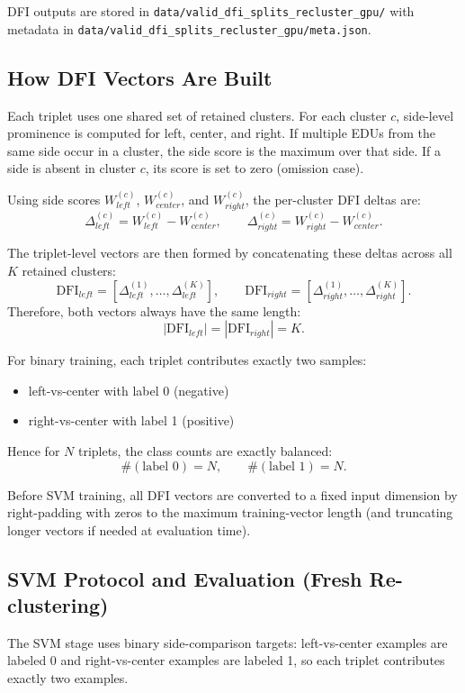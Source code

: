 \documentclass[12pt,a4paper]{article}
\begin{document}
DFI outputs are stored in
\texttt{data/valid\_dfi\_splits\_recluster\_gpu/}
with metadata in
\texttt{data/valid\_dfi\_splits\_recluster\_gpu/meta.json}.

\subsection{How DFI Vectors Are Built}

Each triplet uses one shared set of retained clusters.
For each cluster $c$, side-level prominence is computed for left, center, and right.
If multiple EDUs from the same side occur in a cluster, the side score is the maximum over that side.
If a side is absent in cluster $c$, its score is set to zero (omission case).

Using side scores $W^{(c)}_{left}$, $W^{(c)}_{center}$, and $W^{(c)}_{right}$,
the per-cluster DFI deltas are:
\[
\Delta^{(c)}_{left}=W^{(c)}_{left}-W^{(c)}_{center},\qquad
\Delta^{(c)}_{right}=W^{(c)}_{right}-W^{(c)}_{center}.
\]

The triplet-level vectors are then formed by concatenating these deltas across all $K$ retained clusters:
\[
\mathrm{DFI}_{left}=[\Delta^{(1)}_{left},\ldots,\Delta^{(K)}_{left}],\qquad
\mathrm{DFI}_{right}=[\Delta^{(1)}_{right},\ldots,\Delta^{(K)}_{right}].
\]
Therefore, both vectors always have the same length:
\[
|\mathrm{DFI}_{left}|=|\mathrm{DFI}_{right}|=K.
\]

For binary training, each triplet contributes exactly two samples:
\begin{itemize}
\item left-vs-center with label 0 (negative)
\item right-vs-center with label 1 (positive)
\end{itemize}
Hence for $N$ triplets, the class counts are exactly balanced:
\[
\#(\text{label }0)=N,\qquad \#(\text{label }1)=N.
\]

Before SVM training, all DFI vectors are converted to a fixed input dimension by right-padding with zeros
to the maximum training-vector length (and truncating longer vectors if needed at evaluation time).

\subsection{SVM Protocol and Evaluation (Fresh Re-clustering)}

The SVM stage uses binary side-comparison targets:
left-vs-center examples are labeled 0 and right-vs-center examples are labeled 1,
so each triplet contributes exactly two examples.
\end{document}
